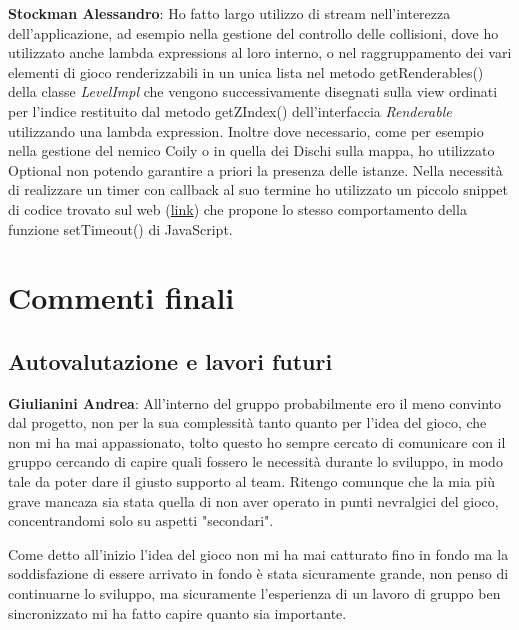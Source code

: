 \documentclass[a4paper,12pt, hidelinks]{report}
\begin{document}
	\item \textbf{Stockman Alessandro}: Ho fatto largo utilizzo di stream nell'interezza dell'applicazione, ad esempio nella gestione del controllo delle collisioni, dove ho utilizzato anche lambda expressions al loro interno, o nel raggruppamento dei vari elementi di gioco renderizzabili in un unica lista nel metodo getRenderables() della classe \emph{LevelImpl} che vengono successivamente disegnati sulla view ordinati per l'indice restituito dal metodo getZIndex() dell'interfaccia \emph{Renderable} utilizzando una lambda expression.
	Inoltre dove necessario, come per esempio nella gestione del nemico Coily o in quella dei Dischi sulla mappa, ho utilizzato Optional non potendo garantire a priori la presenza delle istanze.
	Nella necessità di realizzare un timer con callback al suo termine ho utilizzato un piccolo snippet di codice trovato sul web (\href{https://stackoverflow.com/questions/26311470/what-is-the-equivalent-of-javascript-settimeout-in-java}{link}) che propone lo stesso comportamento della funzione setTimeout() di JavaScript.

\chapter{Commenti finali}


\section{Autovalutazione e lavori futuri}

	\item \textbf{Giulianini Andrea}: All'interno del gruppo probabilmente ero il meno convinto dal progetto, non per la sua complessità tanto quanto per l'idea del gioco, che non mi ha mai appassionato, tolto questo ho sempre cercato di comunicare con il gruppo cercando di capire quali fossero le necessità durante lo sviluppo, in modo tale da poter dare il giusto supporto al team. Ritengo comunque che la mia più grave mancaza sia stata quella di non aver operato in punti nevralgici del gioco, concentrandomi solo su aspetti "secondari".
	
Come detto all'inizio l'idea del gioco non mi ha mai catturato fino in fondo ma la soddisfazione di essere arrivato in fondo è stata sicuramente grande, non penso di continuarne lo sviluppo, ma sicuramente l'esperienza di un lavoro di gruppo ben sincronizzato mi ha fatto capire quanto sia importante.
\end{document}
